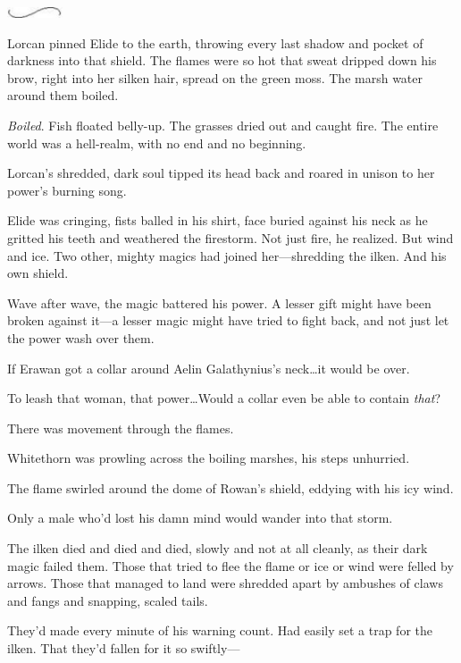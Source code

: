 \begin{center}
	\includegraphics[width=0.65in,height=0.13in]{images/seperator}
\end{center}

Lorcan pinned Elide to the earth, throwing every last shadow and pocket of darkness into that shield.
The flames were so hot that sweat dripped down his brow, right into her silken hair, spread on the green moss.
The marsh water around them boiled.

\emph{Boiled}.
Fish floated belly-up.
The grasses dried out and caught fire.
The entire world was a hell-realm, with no end and no beginning.

Lorcan's shredded, dark soul tipped its head back and roared in unison to her power's burning song.

Elide was cringing, fists balled in his shirt, face buried against his neck as he gritted his teeth and weathered the firestorm.
Not just fire, he realized.
But wind and ice.
Two other, mighty magics had joined her---shredding the ilken.
And his own shield.

Wave after wave, the magic battered his power.
A lesser gift might have been broken against it---a lesser magic might have tried to fight back, and not just let the power wash over them.

If Erawan got a collar around Aelin Galathynius's neck\ldots it would be over.

To leash that woman, that power\ldots Would a collar even be able to contain \emph{that}?

There was movement through the flames.

Whitethorn was prowling across the boiling marshes, his steps unhurried.

The flame swirled around the dome of Rowan's shield, eddying with his icy wind.

Only a male who'd lost his damn mind would wander into that storm.

The ilken died and died and died, slowly and not at all cleanly, as their dark magic failed them.
Those that tried to flee the flame or ice or wind were felled by arrows.
Those that managed to land were shredded apart by ambushes of claws and fangs and snapping, scaled tails.

They'd made every minute of his warning count.
Had easily set a trap for the ilken.
That they'd fallen for it so swiftly---


